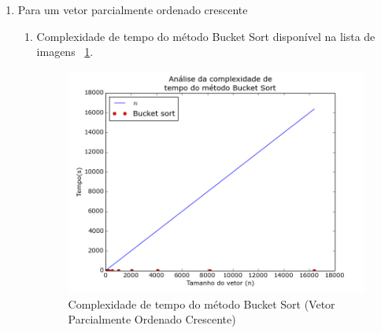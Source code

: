 \documentclass[12pt,a4paper,twoside]{report}
\begin{document}
\begin{enumerate}
\begin{enumerate}
				\end{enumerate}


			\item Para um vetor parcialmente ordenado crescente
							\begin{enumerate}
								\item Complexidade de tempo do método Bucket Sort disponível na lista de imagens ~\ref{fig:BucketPlot2POC}.
								\begin{figure}[!h]
									\centering
									\includegraphics[scale=0.6]{../imagens/Bucket/Bucket_plot_2_parcialmente_ordenado_crescente.png}
									\caption{Complexidade de tempo do método Bucket Sort (Vetor Parcialmente Ordenado Crescente) \label{fig:BucketPlot2POC}}
								\end{figure}



\end{enumerate}
\end{enumerate}
\end{document}
